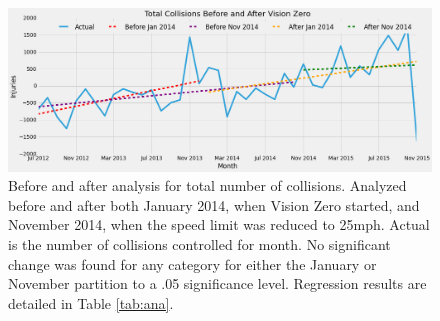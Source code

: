 \documentclass[10pt,journal,compsoc]{IEEEtran}
\begin{document}
\begin{figure}[h]
	\centering
	\includegraphics[width=\textwidth]{fig3.png}
	\caption{Before and after analysis for total number of collisions.  Analyzed before and after both January 2014, when Vision Zero started, and November 2014, when the speed limit was reduced to 25mph.  Actual is the number of collisions controlled for month.  No significant change was found for any category for either the January or November partition to a .05 significance level.  Regression results are detailed in Table \ref{tab:ana}.}\label{fig:totalana}
\end{figure}
\end{document}
